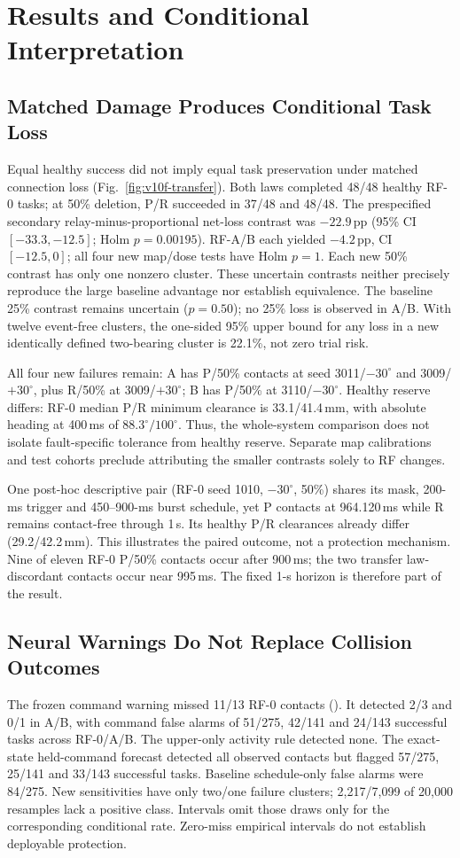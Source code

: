 \section{Results and Conditional Interpretation}
\subsection{Matched Damage Produces Conditional Task Loss}
Equal healthy success did not imply equal task preservation under matched connection loss (Fig.~\ref{fig:v10f-transfer}). Both laws completed 48/48 healthy RF-0 tasks; at 50\% deletion, P/R succeeded in 37/48 and 48/48. The prespecified secondary relay-minus-proportional net-loss contrast was $-22.9$\,pp (95\% CI $[-33.3,-12.5]$; Holm $p=0.00195$). RF-A/B each yielded $-4.2$\,pp, CI $[-12.5,0]$; all four new map/dose tests have Holm $p=1$. Each new 50\% contrast has only one nonzero cluster. These uncertain contrasts neither precisely reproduce the large baseline advantage nor establish equivalence. The baseline 25\% contrast remains uncertain ($p=0.50$); no 25\% loss is observed in A/B. With twelve event-free clusters, the one-sided 95\% upper bound for any loss in a new identically defined two-bearing cluster is 22.1\%, not zero trial risk.

All four new failures remain: A has P/50\% contacts at seed 3011/$-30^\circ$ and 3009/$+30^\circ$, plus R/50\% at 3009/$+30^\circ$; B has P/50\% at 3110/$-30^\circ$. Healthy reserve differs: RF-0 median P/R minimum clearance is 33.1/41.4\,mm, with absolute heading at 400\,ms of $88.3^\circ/100^\circ$. Thus, the whole-system comparison does not isolate fault-specific tolerance from healthy reserve. Separate map calibrations and test cohorts preclude attributing the smaller contrasts solely to RF changes.

One post-hoc descriptive pair (RF-0 seed 1010, $-30^\circ$, 50\%) shares its mask, 200-ms trigger and 450--900-ms burst schedule, yet P contacts at 964.120\,ms while R remains contact-free through 1\,s. Its healthy P/R clearances already differ (29.2/42.2\,mm). This illustrates the paired outcome, not a protection mechanism. Nine of eleven RF-0 P/50\% contacts occur after 900\,ms; the two transfer law-discordant contacts occur near 995\,ms. The fixed 1-s horizon is therefore part of the result.

\subsection{Neural Warnings Do Not Replace Collision Outcomes}
\WarningFigure
The frozen command warning missed 11/13 RF-0 contacts (\warningRef). It detected 2/3 and 0/1 in A/B, with command false alarms of 51/275, 42/141 and 24/143 successful tasks across RF-0/A/B. The upper-only activity rule detected none. The exact-state held-command forecast detected all observed contacts but flagged 57/275, 25/141 and 33/143 successful tasks. Baseline schedule-only false alarms were 84/275. New sensitivities have only two/one failure clusters; 2,217/7,099 of 20,000 resamples lack a positive class. Intervals omit those draws only for the corresponding conditional rate. Zero-miss empirical intervals do not establish deployable protection.

